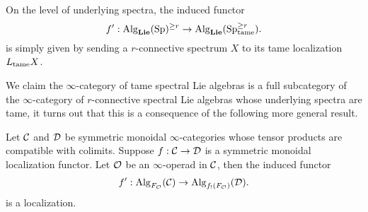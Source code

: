 On the level of underlying spectra,
the induced functor 
$$
f': \operatorname{Alg}_{\mathbf{Lie}}(\operatorname{Sp})^{\geq r} 
\to 
\operatorname{Alg}_{\mathbf{Lie}}(\operatorname{Sp}^{\geq r}_{\operatorname{\operatorname{tame}}}).
$$
is simply given by sending a $r$-connective spectrum $X$ to its tame localization $L_{\operatorname{\operatorname{tame}}}X$.

We claim the $\infty$-category of tame spectral Lie algebras is a full subcategory of the $\infty$-category of $r$-connective spectral Lie algebras whose underlying spectra are tame, it turns out that this is a consequence of the following more general result.
\begin{proposition}
\label{Lifting localization to algebra category}
Let ${\mathcal{C}}$ and ${\mathcal{D}}$ be symmetric monoidal $\infty$-categories whose tensor products are compatible with colimits.
Suppose $f:{\mathcal{C}} \to {\mathcal{D}}$ is a symmetric monoidal localization functor.
Let ${\mathcal{O}}$ be an $\infty$-operad in ${\mathcal{C}}$, then the induced functor
$$
f' : \operatorname{Alg}_{F_{\mathcal{O}}}({\mathcal{C}}) \to \operatorname{Alg}_{f_{!}(F_{\mathcal{O}})}({\mathcal{D}}).
$$
is a localization.
\end{proposition}
